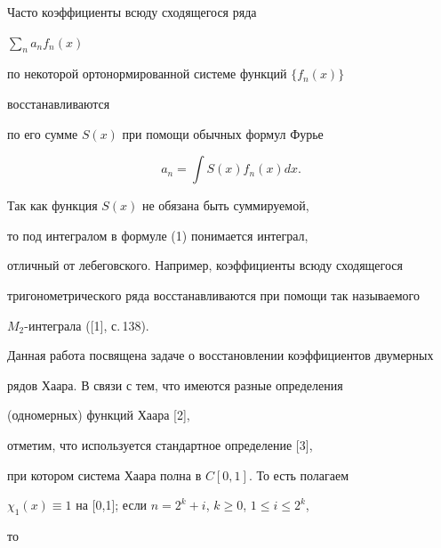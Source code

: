 \pagestyle{plain} %







\maketitle


\label{begin}








Часто коэффициенты всюду сходящегося ряда 


$\sum\limits_{n}a_{n}f_{n}(x)$


по некоторой ортонормированной системе функций $\{f_{n}(x)\}$ 


восстанавливаются 


по его сумме $S(x)$ при помощи обычных формул Фурье


\begin{equation}


a_{n}=\int S(x)f_{n}(x)dx. 


\end{equation}


Так как функция $S(x)$ не обязана быть суммируемой, 


то под интегралом в формуле (1) понимается интеграл, 


отличный от лебеговского. Например, коэффициенты всюду сходящегося 


тригонометрического ряда восстанавливаются при помощи так называемого 


$M_{2}$-интеграла ([1], с.\,138).





Данная работа посвящена задаче о восстановлении коэффициентов двумерных 


рядов Хаара. В связи с тем, что имеются разные определения 


(одномерных) функций Хаара [2], 


отметим, что используется стандартное определение [3], 


при котором система Хаара полна в $C[0,1]$. То есть полагаем


$\chi_1(x)\equiv 1$ на [0,1]; если $n=2^k+i$, $k \ge 0$, $1 \le i \le 2^k$, 


то


$$



